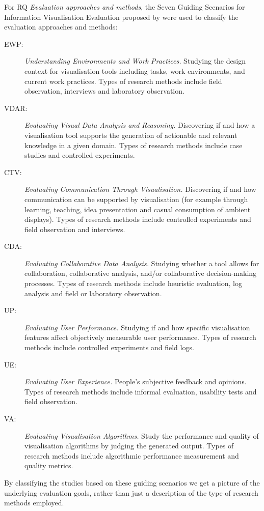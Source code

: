 For RQ \textit{Evaluation approaches and methods}, the Seven Guiding Scenarios for Information Visualisation Evaluation proposed by \citet{lam12} were used to classify the evaluation approaches and methods:

\begin{description}
\item[EWP:] \emph{Understanding Environments and Work Practices.} Studying the design context for visualisation tools including tasks, work environments, and current work practices. Types of research methods include field observation, interviews and laboratory observation.
\item[VDAR:] \emph{Evaluating Visual Data Analysis and Reasoning.} Discovering if and how a visualisation tool supports the generation of actionable
and relevant knowledge in a given domain. Types of research methods include case studies and controlled experiments.
\item[CTV:] \emph{Evaluating Communication Through Visualisation.} Discovering if and how communication can be supported by visualisation (for example through learning, teaching, idea presentation and casual consumption of ambient displays). Types of research methods include controlled experiments and field observation and interviews. 
\item[CDA:] \emph{Evaluating Collaborative Data Analysis.} Studying whether a tool allows for collaboration, collaborative analysis, and/or collaborative decision-making processes. Types of research methods include heuristic evaluation, log analysis and field or laboratory observation.
\item[UP:] \emph{Evaluating User Performance.} Studying if and how specific visualisation features affect objectively measurable user performance. Types of research methods include controlled experiments and field logs.
\item[UE:] \emph{Evaluating User Experience.} People's subjective feedback and opinions.  Types of research methods include informal evaluation, usability tests and field observation.
\item[VA:] \emph{Evaluating Visualisation Algorithms.} Study the performance and quality of visualisation algorithms by judging the generated output. Types of research methods include algorithmic performance measurement and quality metrics.
\end{description}

By classifying the studies based on these guiding scenarios we get a picture of the underlying evaluation goals, rather than just a description of the type of research methods employed. 

